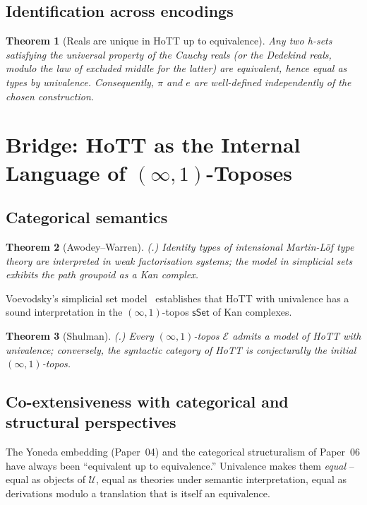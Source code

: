 \documentclass[12pt]{article}
\newtheorem{theorem}{Theorem}[section]
\theoremstyle{definition}
\theoremstyle{remark}
\newcommand{\U}{\mathcal{U}}
\begin{document}
\subsection{Identification across encodings}

\begin{theorem}[Reals are unique in HoTT up to equivalence]
\label{thm:reals-unique}
Any two h-sets satisfying the universal property of the Cauchy reals (or
the Dedekind reals, modulo the law of excluded middle for the latter) are
equivalent, hence equal as types by univalence. Consequently, $\pi$ and $e$
are well-defined independently of the chosen construction.
\end{theorem}

\section{Bridge: HoTT as the Internal Language of \texorpdfstring{$(\infty,1)$}{(infinity,1)}-Toposes}
\label{sec:bridge}

\subsection{Categorical semantics}

\begin{theorem}[Awodey--Warren]
\label{thm:aw}
\textup{(\cite{AwodeyWarren}.)}
Identity types of intensional Martin-L\"of type theory are interpreted in
weak factorisation systems; the model in simplicial sets exhibits the path
groupoid as a Kan complex.
\end{theorem}

Voevodsky's simplicial set model~\cite{KapulkinLumsdaine} establishes that
HoTT with univalence has a sound interpretation in the
$(\infty, 1)$-topos $\mathsf{sSet}$ of Kan complexes.

\begin{theorem}[Shulman]
\label{thm:shulman-it}
\textup{(\cite{ShulmanInftyTopos}.)}
Every $(\infty, 1)$-topos $\mathcal{E}$ admits a model of HoTT with
univalence; conversely, the syntactic category of HoTT is conjecturally
the initial $(\infty, 1)$-topos.
\end{theorem}

\subsection{Co-extensiveness with categorical and structural perspectives}

The Yoneda embedding (Paper~04) and the categorical structuralism of
Paper~06 have always been ``equivalent up to equivalence.'' Univalence
makes them \emph{equal} -- equal as objects of $\U$, equal as theories
under semantic interpretation, equal as derivations modulo a translation
that is itself an equivalence.
\end{document}
